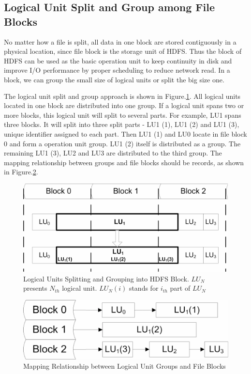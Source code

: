 \documentclass[preprint,12pt]{elsarticle}
\begin{document}
\subsection{Logical Unit Split and Group among File Blocks}
No matter how a file is split, all data in one block are stored contiguously in a physical location, since file block is the storage
unit of HDFS. Thus the block of HDFS can be used as the basic operation unit to keep continuity in disk and improve I/O performance 
by proper scheduling to reduce network read. In a block, we can group the small size of logical units or split the big size one.\par
The logical unit split and group approach is shown in Figure.\ref{figure2}. All logical units located in one block are distributed 
into one group. If a logical unit spans two or more blocks, this logical unit will split to several parts. For example, LU1 spans three 
blocks. It will split into three split parts - LU1 (1), LU1 (2) and LU1 (3), unique identifier assigned to each part. Then LU1 (1) 
and LU0 locate in file block 0 and form a operation unit group. LU1 (2) itself is distributed as a group. The remaining LU1 (3), LU2 
and LU3 are distributed to the third group. The mapping relationship between groups and file blocks should be records, as shown in 
Figure.\ref{figure3}. \par

\begin{figure}
	\centering
	\includegraphics{figure2}
	\caption{Logical Units Splitting and Grouping into HDFS Block. $LU_N$ presents $N_{th}$ logical unit. $LU_N(i)$ stands for 
			$i_{th}$ part of $LU_N$}
	\label{figure2}
\end{figure}

\begin{figure}
	\centering
	\includegraphics{figure3}
	\caption{Mapping Relationship between Logical Unit Groups and File Blocks}
	\label{figure3}
\end{figure}
\end{document}
